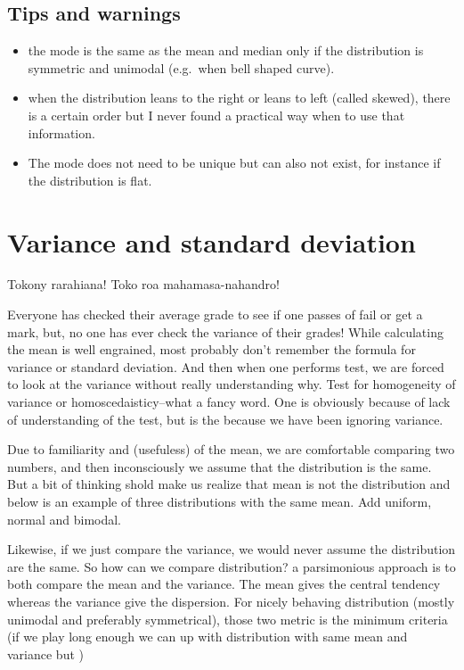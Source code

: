 \documentclass[
  letterpaper,
  DIV=11,
  numbers=noendperiod]{scrreprt}
\providecommand{\tightlist}{%
  \setlength{\itemsep}{0pt}\setlength{\parskip}{0pt}}
\begin{document}
\section*{Tips and warnings}\label{tips-and-warnings-14}


\begin{itemize}
\tightlist
\item
  the mode is the same as the mean and median only if the distribution
  is symmetric and unimodal (e.g.~when bell shaped curve).
\item
  when the distribution leans to the right or leans to left (called
  skewed), there is a certain order but I never found a practical way
  when to use that information.
\item
  The mode does not need to be unique but can also not exist, for
  instance if the distribution is flat.
\end{itemize}

\chapter{Variance and standard deviation}\label{sec-variance}

Tokony rarahiana! Toko roa mahamasa-nahandro!

Everyone has checked their average grade to see if one passes of fail or
get a mark, but, no one has ever check the variance of their grades!
While calculating the mean is well engrained, most probably don't
remember the formula for variance or standard deviation. And then when
one performs test, we are forced to look at the variance without really
understanding why. Test for homogeneity of variance or
homoscedaisticy--what a fancy word. One is obviously because of lack of
understanding of the test, but is the because we have been ignoring
variance.

Due to familiarity and (usefuless) of the mean, we are comfortable
comparing two numbers, and then inconsciously we assume that the
distribution is the same. But a bit of thinking shold make us realize
that mean is not the distribution and below is an example of three
distributions with the same mean. Add uniform, normal and bimodal.

Likewise, if we just compare the variance, we would never assume the
distribution are the same. So how can we compare distribution? a
parsimonious approach is to both compare the mean and the variance. The
mean gives the central tendency whereas the variance give the
dispersion. For nicely behaving distribution (mostly unimodal and
preferably symmetrical), those two metric is the minimum criteria (if we
play long enough we can up with distribution with same mean and variance
but )
\end{document}
